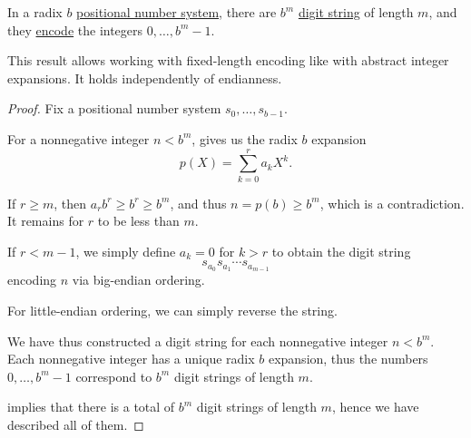 \begin{proposition}\label{thm:def:fixed_length_nonnegative_integer_encoding}
  In a radix \( b \) \hyperref[def:positional_number_system]{positional number system}, there are \( b^m \) \hyperref[def:positional_number_system]{digit string} of length \( m \), and they \hyperref[def:fixed_length_nonnegative_integer_encoding]{encode} the integers \( 0, \ldots, b^m - 1 \).
\end{proposition}
\begin{comments}
  \item This result allows working with fixed-length encoding like with abstract integer expansions. It holds independently of endianness.
\end{comments}
\begin{proof}
  Fix a positional number system \( s_0, \ldots, s_{b-1} \).

  For a nonnegative integer \( n < b^m \),  gives us the radix \( b \) expansion
  \begin{equation*}
    p(X) = \sum_{k=0}^r a_k X^k.
  \end{equation*}

  If \( r \geq m \), then \( a_r b^r \geq b^r \geq b^m \), and thus \( n = p(b) \geq b^m \), which is a contradiction. It remains for \( r \) to be less than \( m \).

  If \( r < m - 1 \), we simply define \( a_k = 0 \) for \( k > r \) to obtain the digit string
  \begin{equation*}
    s_{a_0} s_{a_1} \cdots s_{a_{m-1}}
  \end{equation*}
  encoding \( n \) via big-endian ordering.

  For little-endian ordering, we can simply reverse the string.

  We have thus constructed a digit string for each nonnegative integer \( n < b^m \). Each nonnegative integer has a unique radix \( b \) expansion, thus the numbers \( 0, \ldots, b^m - 1 \) correspond to \( b^m \) digit strings of length \( m \).

   implies that there is a total of \( b^m \) digit strings of length \( m \), hence we have described all of them.
\end{proof}

